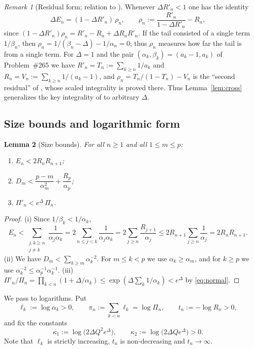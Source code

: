 \documentclass[11pt]{amsart}
\newtheorem{lemma}{Lemma}[section]
\theoremstyle{definition}
\theoremstyle{remark}
\newtheorem{remark}[lemma]{Remark}
\begin{document}
\begin{remark}[Residual form; relation to \cite{Kit26}]\label{rem:residual}
Whenever $\Delta R'_n<1$ one has the identity
\[
\Delta E_n=(1-\Delta R'_n)\,\rho_n,\qquad \rho_n:=\frac{R'_n}{1-\Delta R'_n}-R_n ,
\]
since $(1-\Delta R'_n)\rho_n=R'_n-R_n+\Delta R_nR'_n$. If the tail consisted of a single
term $1/\beta_n$, then $\rho_n=1/(\beta_n-\Delta)-1/\alpha_n=0$; thus $\rho_n$ measures
how far the tail is from a single term. For $\Delta=1$ and the pair
$(\alpha_k,\beta_k)=(a_k-1,a_k)$ of Problem~\#265 we have $R'_n=T_n:=\sum_{k\ge n}1/a_k$
and $R_n=V_n:=\sum_{k\ge n}1/(a_k-1)$, and $\rho_n=T_n/(1-T_n)-V_n$ is the ``second
residual'' of \cite{Kit26}, whose scaled integrality is proved there. Thus
Lemma~\ref{lem:cross} generalizes the key integrality of \cite{Kit26} to arbitrary
$\Delta$.
\end{remark}

\subsection{Size bounds and logarithmic form}

\begin{lemma}[Size bounds]\label{lem:size}
For all $n\ge1$ and all $1\le m\le p$:
\begin{enumerate}[label=\textup{(\roman*)}]
\item $E_n<2R_nR_{n+1}$;
\item $D_m<\dfrac{p-m}{\alpha_m^2}+\dfrac{R_p}{\alpha_p}$;
\item $\Pi'_n<e^{\Delta}\,\Pi_n$.
\end{enumerate}
\end{lemma}

\begin{proof}
(i) Since $1/\beta_k<1/\alpha_k$,
\[
E_n<\sum_{\substack{j,k\ge n\\ j\neq k}}\frac1{\alpha_j\alpha_k}
=2\sum_{n\le j<k}\frac1{\alpha_j\alpha_k}=2\sum_{j\ge n}\frac{R_{j+1}}{\alpha_j}
\le 2R_{n+1}\sum_{j\ge n}\frac{1}{\alpha_j}=2R_nR_{n+1}.
\]
(ii) We have $D_m<\sum_{k\ge m}\alpha_k^{-2}$. For $m\le k<p$ we use
$\alpha_k\ge\alpha_m$, and for $k\ge p$ we use $\alpha_k^{-2}\le\alpha_p^{-1}\alpha_k^{-1}$.
(iii) $\Pi'_n/\Pi_n=\prod_{k<n}(1+\Delta/\alpha_k)\le\exp(\Delta\sum_k1/\alpha_k)<e^{\Delta}$
by \eqref{eq:normal}.
\end{proof}

We pass to logarithms. Put
\[
\ell_k:=\log\alpha_k>0,\qquad \pi_n:=\sum_{k<n}\ell_k=\log\Pi_n,\qquad t_n:=-\log R_n>0,
\]
and fix the constants
\[
\kappa_1:=\log\bigl(2\Delta Q^2e^{\Delta}\bigr),\qquad \kappa_2:=\log\bigl(2\Delta Qe^{\Delta}\bigr)>0 .
\]
Note that $\ell_k$ is strictly increasing, $t_n$ is non-decreasing and $t_n\to\infty$.
\end{document}

